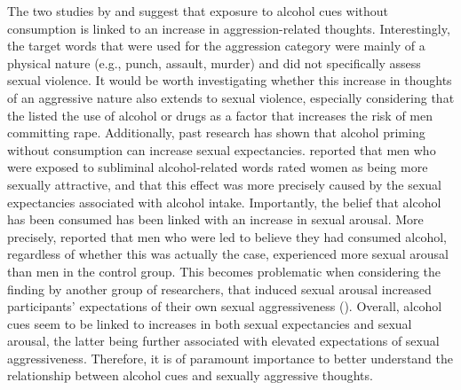 \documentclass[serif, authordate, twocolumn, empirical]{jote-article}
\begin{document}
The two studies by \textcite{BartholowHeinz2006} and \textcite{SubraMullerBegueLBushmanDelmas2010} suggest that exposure to alcohol cues without consumption is linked to an increase in aggression-related thoughts. Interestingly, the target words that were used for the aggression category were mainly of a physical nature (e.g., punch, assault, murder) and did not specifically assess sexual violence. It would be worth investigating whether this increase in thoughts of an aggressive nature also extends to sexual violence, especially considering that the \textcite{WHOSex} listed the use of alcohol or drugs as a factor that increases the risk of men committing rape. Additionally, past research has shown that alcohol priming without consumption can increase sexual expectancies. \textcite{FriedmanMcCarthyForsterJDenzler2005} reported that men who were exposed to subliminal alcohol-related words rated women as being more sexually attractive, and that this effect was more precisely caused by the sexual expectancies associated with alcohol intake. Importantly, the belief that alcohol has been consumed has been linked with an increase in sexual arousal. More precisely, \textcite{AbbeyMcAuslanZawackiClintonBuck2001} reported that men who were led to believe they had consumed alcohol, regardless of whether this was actually the case, experienced more sexual arousal than men in the control group. This becomes problematic when considering the finding by another group of researchers, that induced sexual arousal increased participants’ expectations of their own sexual aggressiveness (\cite{LoewensteinNaginPaternoster1997}). Overall, alcohol cues seem to be linked to increases in both sexual expectancies and sexual arousal, the latter being further associated with elevated expectations of sexual aggressiveness. Therefore, it is of paramount importance to better understand the relationship between alcohol cues and sexually aggressive thoughts.
\end{document}
